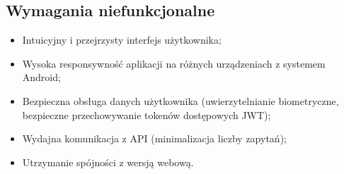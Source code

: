 \documentclass{article}
\begin{document}
	\subsection*{Wymagania niefunkcjonalne}
	\begin{itemize}
		\item Intuicyjny i przejrzysty interfejs użytkownika;
		\item Wysoka responsywność aplikacji na różnych urządzeniach z systemem Android;
		\item Bezpieczna obsługa danych użytkownika (uwierzytelnianie biometryczne, bezpieczne przechowywanie tokenów dostępowych JWT);
		\item Wydajna komunikacja z API (minimalizacja liczby zapytań);
		\item Utrzymanie spójności z wersją webową.
	\end{itemize}
\end{document}
